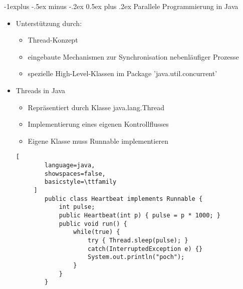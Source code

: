 \documentclass[10pt]{article}
\makeatletter
\renewcommand{\subsection}{\@startsection{subsection}{2}{0mm}%
                                {-1explus -.5ex minus -.2ex}%
                                {0.5ex plus .2ex}%
                                {\normalfont\normalsize\bfseries}}
\makeatother
\begin{document}
\subsection{Parallele Programmierung in Java}
\begin{itemize}
  \item Unterstützung durch:
        \begin{itemize}
          \item Thread-Konzept
          \item eingebaute Mechanismen zur Synchronisation nebenläufiger Prozesse
          \item spezielle High-Level-Klassen im Package 'java.util.concurrent'
        \end{itemize}
  \item Threads in Java
        \begin{itemize}
          \item Repräsentiert durch Klasse java.lang.Thread
          \item Implementierung eines eigenen Kontrollflusses
          \item Eigene Klasse muss Runnable implementieren
        \end{itemize}
        \begin{lstlisting}[
        language=java,
        showspaces=false,
        basicstyle=\ttfamily
     ]
        public class Heartbeat implements Runnable {
            int pulse;
            public Heartbeat(int p) { pulse = p * 1000; }
            public void run() {
                while(true) {
                    try { Thread.sleep(pulse); }
                    catch(InterruptedException e) {}
                    System.out.println("poch");
                }
            }
        }


\end{lstlisting}
\end{itemize}
\end{document}
